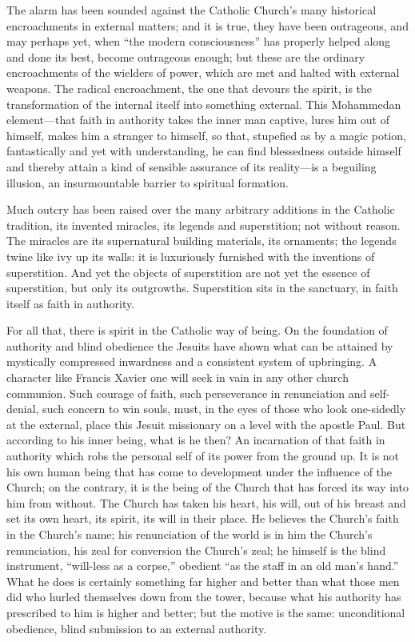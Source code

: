 \documentclass[12pt,a4paper,openany]{book}
\newcommand{\opage}[1]{\marginnote{\footnotesize\textit{[#1]}}}
\begin{document}
The alarm has been sounded against the Catholic Church's many historical
encroachments in external matters; and it is true, they have been
outrageous, and may perhaps yet, when ``the modern consciousness'' has
properly helped along and done its best, become outrageous enough; but
these are the ordinary encroachments of the wielders of power, which are
met and halted with external weapons. The radical encroachment, the one
that devours the spirit, is the transformation of the internal itself
into something external. This Mohammedan element---that faith in
authority takes the inner man captive, lures him out of himself, makes
him a stranger to himself, so that, stupefied as by a magic potion,
fantastically and yet with understanding, he can find blessedness
outside himself and thereby attain a kind of sensible assurance of its
reality---is a beguiling illusion, an insurmountable barrier to
spiritual formation.

Much outcry has been raised over the many arbitrary additions in the
Catholic tradition, its invented miracles, its legends and superstition;
not without reason. The miracles are its supernatural building
materials, its ornaments; the legends twine like ivy up its walls: it is
luxuriously furnished with the inventions of superstition. And yet the
objects of superstition are not yet the essence of superstition, but
only its \opage{23}outgrowths. Superstition sits in the sanctuary, in faith itself
as faith in authority.

For all that, there is spirit in the Catholic way of being. On the
foundation of authority and blind obedience the Jesuits have shown what
can be attained by mystically compressed inwardness and a consistent
system of upbringing. A character like Francis Xavier one will seek in
vain in any other church communion. Such courage of faith, such
perseverance in renunciation and self-denial, such concern to win souls,
must, in the eyes of those who look one-sidedly at the external, place
this Jesuit missionary on a level with the apostle Paul. But according to
his inner being, what is he then? An incarnation of that faith in
authority which robs the personal self of its power from the ground up.
It is not his own human being that has come to development under the
influence of the Church; on the contrary, it is the being of the Church
that has forced its way into him from without. The Church has taken his
heart, his will, out of his breast and set its own heart, its spirit,
its will in their place. He believes the Church's faith in the Church's
name; his renunciation of the world is in him the Church's renunciation,
his zeal for conversion the Church's zeal; he himself is the blind
instrument, ``will-less as a corpse,'' obedient ``as the staff in an old
man's hand.'' What he does is certainly something far higher and better
than what those men did who hurled themselves down from the tower,
because what his authority has prescribed to him is higher and better;
but the motive is the same: unconditional obedience, blind submission to
an external authority.
\end{document}
